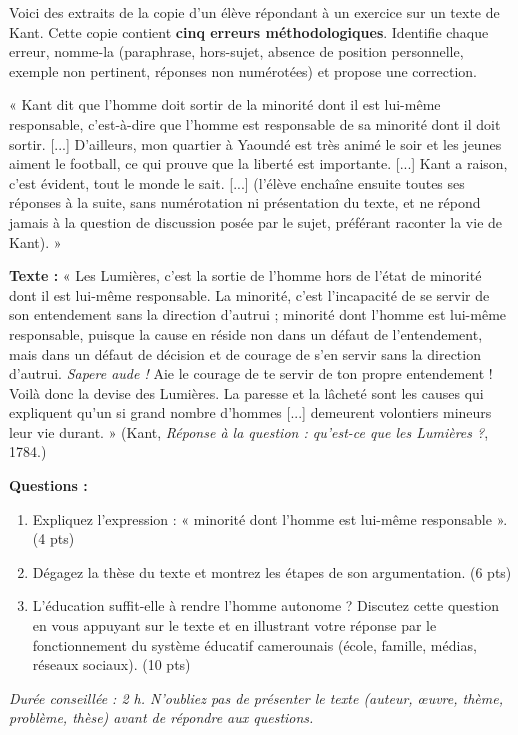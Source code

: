\documentclass[11pt]{article}
\newcounter{popsec}
\newcounter{popsub}
\newcommand{\courssub}[1]{%
  \stepcounter{popsub}%
  \par\vspace{9pt}\noindent{\popxbold\fontsize{11.5}{13}\selectfont\color{popink}{\color{poporange}\thepopsec.\thepopsub}\hspace{6pt}#1}\par\nopagebreak\vspace{4pt}
}
\begin{document}
\begin{exercice}
Voici des extraits de la copie d'un élève répondant à un exercice sur un texte de Kant. Cette copie contient \textbf{cinq erreurs méthodologiques}. Identifie chaque erreur, nomme-la (paraphrase, hors-sujet, absence de position personnelle, exemple non pertinent, réponses non numérotées) et propose une correction.

« Kant dit que l'homme doit sortir de la minorité dont il est lui-même responsable, c'est-à-dire que l'homme est responsable de sa minorité dont il doit sortir. [...] D'ailleurs, mon quartier à Yaoundé est très animé le soir et les jeunes aiment le football, ce qui prouve que la liberté est importante. [...] Kant a raison, c'est évident, tout le monde le sait. [...] (l'élève enchaîne ensuite toutes ses réponses à la suite, sans numérotation ni présentation du texte, et ne répond jamais à la question de discussion posée par le sujet, préférant raconter la vie de Kant). »
\end{exercice}

\courssub{Je me prépare au Bac}

\begin{exercice}
\textbf{Texte :} « Les Lumières, c'est la sortie de l'homme hors de l'état de minorité dont il est lui-même responsable. La minorité, c'est l'incapacité de se servir de son entendement sans la direction d'autrui ; minorité dont l'homme est lui-même responsable, puisque la cause en réside non dans un défaut de l'entendement, mais dans un défaut de décision et de courage de s'en servir sans la direction d'autrui. \emph{Sapere aude !} Aie le courage de te servir de ton propre entendement ! Voilà donc la devise des Lumières. La paresse et la lâcheté sont les causes qui expliquent qu'un si grand nombre d'hommes [...] demeurent volontiers mineurs leur vie durant. » (Kant, \emph{Réponse à la question : qu'est-ce que les Lumières ?}, 1784.)

\textbf{Questions :}
\begin{enumerate}
\item Expliquez l'expression : « minorité dont l'homme est lui-même responsable ». (4 pts)
\item Dégagez la thèse du texte et montrez les étapes de son argumentation. (6 pts)
\item L'éducation suffit-elle à rendre l'homme autonome ? Discutez cette question en vous appuyant sur le texte et en illustrant votre réponse par le fonctionnement du système éducatif camerounais (école, famille, médias, réseaux sociaux). (10 pts)
\end{enumerate}
\emph{Durée conseillée : 2 h. N'oubliez pas de présenter le texte (auteur, œuvre, thème, problème, thèse) avant de répondre aux questions.}
\end{exercice}
\end{document}

